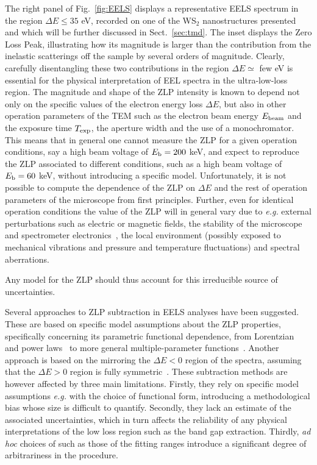 The right panel of Fig.~\ref{fig:EELS} displays
a representative EELS spectrum in the region $\Delta E \le 35$ eV, recorded
on one of the WS$_2$ nanostructures presented~\cite{SabryaWS2}
and which will be further discussed in Sect.~\ref{sec:tmd}.
%
The inset displays the Zero Loss Peak, illustrating how
its magnitude is larger than the contribution from the inelastic scatterings
off the sample by several
orders of magnitude.
%
Clearly, carefully disentangling these two contributions in the region $\Delta E \simeq$ few eV
is essential for the physical interpretation of EEL spectra in the ultra-low-loss region.
%
The magnitude and shape of the ZLP intensity is known to depend not only on the specific values
of the electron energy loss $\Delta E$, but also in other operation parameters
of the TEM such as the electron beam energy $E_{\rm beam}$ and the exposure time
$T_{\rm exp}$, the aperture width and the use of a monochromator. 
%
This means that in general one cannot measure the ZLP for a given operation
conditions, say a high beam voltage of $E_{\rm b}=200$ keV, and expect to reproduce
the ZLP associated to different conditions, such as a  high beam voltage of $E_{\rm b}=60$ keV,
without introducing a specific model.
%
Unfortunately, it is not possible to compute the dependence of the ZLP on $\Delta E$
and the rest of operation parameters of the microscope from first principles.
%
Further, even for identical operation conditions the value of the ZLP
will in general vary due to {\it e.g.} external perturbations such as electric or magnetic fields,
the stability of the microscope and spectrometer electronics~\cite{Kothleitner:2003}, the local
environment (possibly exposed to mechanical vibrations and pressure and temperature fluctuations) 
and spectral aberrations\cite{Egerton:1996, Scherzer:1949}. 
%

Any model for the ZLP should thus account for this irreducible source of uncertainties.

Several approaches to ZLP subtraction in EELS analyses have been suggested.
%
These are based on specific model assumptions about the ZLP properties, specifically
concerning its parametric functional dependence, from Lorentzian~\cite{Dorneich:1998}
and power laws~\cite{Erni:2005} to more general multiple-parameter functions~\cite{Benthem:2001}.
%
Another approach is based on the mirroring the $\Delta E <0$ region of the spectra, assuming
that the $\Delta E>0$ region is fully symmetric~\cite{Lazar:2003}.
%
These  subtraction methods are however affected by three main limitations.
%
Firstly, they rely on specific model assumptions {\it e.g.} with
the choice of functional form, introducing a methodological
bias whose size is difficult to quantify.
%
Secondly, they lack an estimate of the associated uncertainties, which in turn affects
the reliability of any physical interpretations of the low loss region such as the band gap extraction.
%
Thirdly, {\it ad hoc} choices of such as those of the fitting ranges introduce a significant degree of
arbitrariness in the procedure.
      
